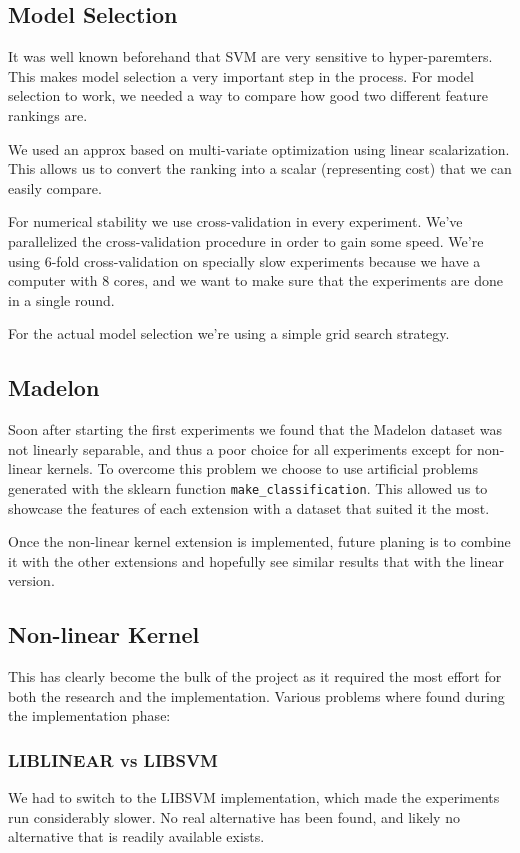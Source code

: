 \subsection{Model Selection}
It was well known beforehand that SVM are very sensitive to hyper-paremters. This makes model selection a very important step in the process. For model selection to work, we needed a way to compare how good two different feature rankings are.

We used an approx based on multi-variate optimization using linear scalarization. This allows us to convert the ranking into a scalar (representing cost) that we can easily compare.

For numerical stability we use cross-validation in every experiment. We've paral\-lelized the cross-validation procedure in order to gain some speed. We're using 6-fold cross-validation on specially slow experiments because we have a computer with 8 cores, and we want to make sure that the experiments are done in a single round.

For the actual model selection we're using a simple grid search strategy.

\subsection{Madelon}

Soon after starting the first experiments we found that the Madelon dataset was not linearly separable, and thus a poor choice for all experiments except for non-linear kernels. To overcome this problem we choose to use artificial problems generated with the sklearn function \texttt{make\_classification}. This allowed us to showcase the features of each extension with a dataset that suited it the most.

Once the non-linear kernel extension is implemented, future planing is to combine it with the other extensions and hopefully see similar results that with the linear version.

\subsection{Non-linear Kernel}

This has clearly become the bulk of the project as it required the most effort for both the research and the implementation. Various problems where found during the implementation phase:

\subsubsection*{LIBLINEAR vs LIBSVM}
We had to switch to the LIBSVM implementation, which made the experiments run considerably slower. No real alternative has been found, and likely no alternative that is readily available exists.

